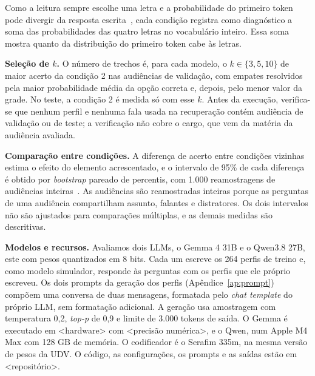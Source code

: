 Como a leitura sempre escolhe uma letra e a probabilidade do primeiro token pode divergir da
resposta escrita~\citep{wang2024answer}, cada condição registra como diagnóstico a soma das
probabilidades das quatro letras no vocabulário inteiro. Essa soma mostra quanto da distribuição do
primeiro token cabe às letras.

\textbf{Seleção de $k$.} O número de trechos é, para cada modelo, o $k \in \{3, 5, 10\}$ de maior
acerto da condição 2 nas audiências de validação, com empates resolvidos pela maior probabilidade média da opção correta
e, depois, pelo menor valor da grade. No teste, a condição 2 é medida só com esse $k$. Antes da
execução, verifica-se que nenhum perfil e nenhuma fala usada na recuperação contém audiência de
validação ou de teste; a verificação não cobre o cargo, que vem da matéria da audiência avaliada.

\textbf{Comparação entre condições.} A diferença de acerto entre condições vizinhas estima o efeito
do elemento acrescentado, e o intervalo de 95\% de cada diferença é obtido por \textit{bootstrap}
pareado de percentis, com 1.000 reamostragens de audiências inteiras~\citep{efron1993introduction}.
As audiências são reamostradas inteiras porque as perguntas de uma audiência compartilham assunto,
falantes e distratores. Os dois intervalos não são ajustados para comparações múltiplas, e as demais
medidas são descritivas.

\textbf{Modelos e recursos.} Avaliamos dois LLMs, o Gemma 4 31B e o Qwen3.8 27B, este com pesos
quantizados em 8 bits. Cada um escreve os 264 perfis de treino e, como modelo simulador, responde às
perguntas com os perfis que ele próprio escreveu. Os dois prompts da geração dos perfis
(Apêndice~\ref{ap:prompt}) compõem uma conversa de duas mensagens, formatada pelo \textit{chat
template} do próprio LLM, sem formatação adicional. A geração usa amostragem com temperatura 0,2,
\textit{top-p} de 0,9 e limite de 3.000 tokens de saída. O Gemma é executado em <hardware> com
<precisão numérica>, e o Qwen, num Apple M4 Max com 128 GB de memória. O codificador é o Serafim
335m, na mesma versão de pesos da UDV. O código, as configurações, os prompts e as saídas estão em
<repositório>.
